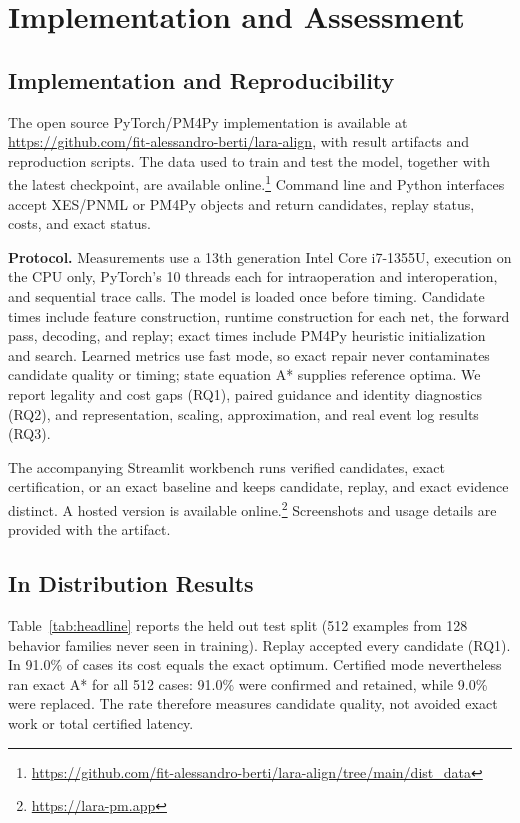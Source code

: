 \documentclass[manuscript,screen,nonacm]{acmart}
\begin{document}
\section{Implementation and Assessment}
\label{sec:assessment}

\subsection{Implementation and Reproducibility}
\label{sec:implementation}

The open source PyTorch/PM4Py implementation \cite{Berti2023} is available at \url{https://github.com/fit-alessandro-berti/lara-align}, with result artifacts and reproduction scripts. The data used to train and test the model, together with the latest checkpoint, are available online.\footnote{\url{https://github.com/fit-alessandro-berti/lara-align/tree/main/dist_data}} Command line and Python interfaces accept XES/PNML or PM4Py objects and return candidates, replay status, costs, and exact status.

\textbf{Protocol.} Measurements use a 13th generation Intel Core i7-1355U, execution on the CPU only, PyTorch's 10 threads each for intraoperation and interoperation, and sequential trace calls. The model is loaded once before timing. Candidate times include feature construction, runtime construction for each net, the forward pass, decoding, and replay; exact times include PM4Py heuristic initialization and search. Learned metrics use fast mode, so exact repair never contaminates candidate quality or timing; state equation A* supplies reference optima. We report legality and cost gaps (RQ1), paired guidance and identity diagnostics (RQ2), and representation, scaling, approximation, and real event log results (RQ3).

The accompanying Streamlit workbench runs verified candidates, exact certification, or an exact baseline and keeps candidate, replay, and exact evidence distinct. A hosted version is available online.\footnote{\url{https://lara-pm.app}} Screenshots and usage details are provided with the artifact.

\subsection{In Distribution Results}
\label{sec:indist}

Table~\ref{tab:headline} reports the held out test split (512 examples from 128 behavior families never seen in training). Replay accepted every candidate (RQ1). In 91.0\% of cases its cost equals the exact optimum. Certified mode nevertheless ran exact A* for all 512 cases: 91.0\% were confirmed and retained, while 9.0\% were replaced. The rate therefore measures candidate quality, not avoided exact work or total certified latency.
\end{document}
